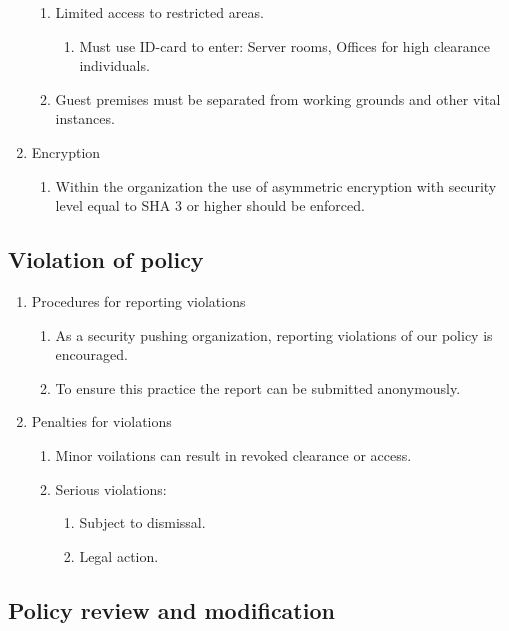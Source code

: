 \begin{enumerate}
\begin{enumerate}
    \item Limited access to restricted areas.
    \begin{enumerate}
      \item Must use ID-card to enter: Server rooms, Offices for high clearance individuals.
    \end{enumerate}
    \item Guest premises must be separated from working grounds and other vital instances.
  \end{enumerate}
  \item Encryption
  \begin{enumerate}
    \item Within the organization the use of asymmetric encryption with security level equal to SHA 3 or higher should be enforced.
  \end{enumerate}
\end{enumerate}

\subsection{Violation of policy}

\begin{enumerate}
  \item Procedures for reporting violations
  \begin{enumerate}
    \item As a security pushing organization, reporting violations of our policy is encouraged.
    \item To ensure this practice the report can be submitted anonymously.
  \end{enumerate}
    \item Penalties for violations
  \begin{enumerate}
    \item Minor voilations can result in revoked clearance or access.
    \item Serious violations:
    \begin{enumerate}
      \item Subject to dismissal.
      \item Legal action.
    \end{enumerate}
  \end{enumerate}
\end{enumerate}

\subsection{Policy review and modification}

